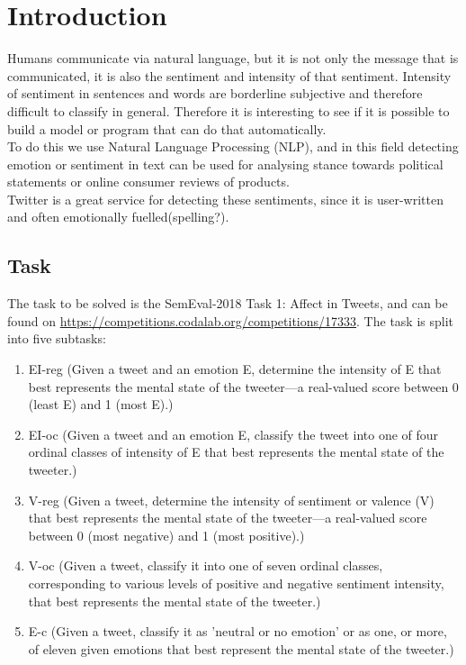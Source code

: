 \section{Introduction}
Humans communicate via natural language, but it is not only the message that is communicated, it is also the sentiment and intensity of that sentiment. Intensity of sentiment in sentences and words are borderline subjective and therefore difficult to classify in general. Therefore it is interesting to see if it is possible to build a model or program that can do that automatically. \\
To do this we use Natural Language Processing (NLP), and in this field detecting emotion or sentiment in text can be used for analysing stance towards political statements or online consumer reviews of products. \\
Twitter is a great service for detecting these sentiments, since it is user-written and often emotionally fuelled(spelling?).
\subsection{Task} \label{sec:task}
The task to be solved is the SemEval-2018 Task 1: Affect in Tweets, and can be found on \hyperref[https://competitions.codalab.org/competitions/17333]{https://competitions.codalab.org/competitions/17333}. The task is split into five subtasks:\\
\begin{enumerate}
\item EI-reg (Given a tweet and an emotion E, determine the  intensity of E that best represents the mental state of the tweeter—a real-valued score between 0 (least E) and 1 (most E).)
\item EI-oc (Given a tweet and an emotion E, classify the tweet into one of four ordinal classes of intensity of E that best represents the mental state of the tweeter.)
\item V-reg (Given a tweet, determine the intensity of sentiment or valence (V) that best represents the mental state of the tweeter—a real-valued score between 0 (most negative) and 1 (most positive).)
\item V-oc (Given a tweet, classify it into one of seven ordinal classes, corresponding to various levels of positive and negative sentiment intensity, that best represents the mental state of the tweeter.)
\item E-c (Given a tweet, classify it as 'neutral or no emotion' or as one, or more, of eleven given emotions that best represent the mental state of the tweeter.)
\end{enumerate}
 
